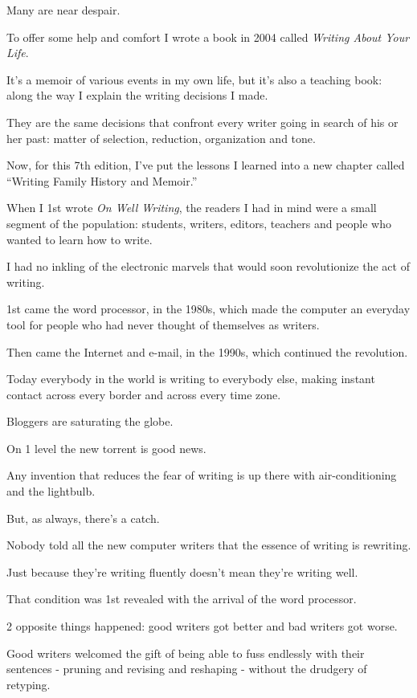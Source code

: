 \documentclass{book}
\numberwithin{equation}{section}
\begin{document}
Many are near despair.

To offer some help and comfort I wrote a book in 2004 called \textit{Writing About Your Life}.

It's a memoir of various events in my own life, but it's also a teaching book: along the way I explain the writing decisions I made.

They are the same decisions that confront every writer going in search of his or her past: matter of selection, reduction, organization and tone.

Now, for this 7th edition, I've put the lessons I learned into a new chapter called ``Writing Family History and Memoir.''

%
When I 1st wrote \textit{On Well Writing}, the readers I had in mind were a small segment of the population: students, writers, editors, teachers and people who wanted to learn how to write.

I had no inkling of the electronic marvels that would soon revolutionize the act of writing.

1st came the word processor, in the 1980s, which made the computer an everyday tool for people who had never thought of themselves as writers.

Then came the Internet and e-mail, in the 1990s, which continued the revolution.

Today everybody in the world is writing to everybody else, making instant contact across every border and across every time zone.

Bloggers are saturating the globe.

%
On 1 level the new torrent is good news.

Any invention that reduces the fear of writing is up there with air-conditioning and the lightbulb.

But, as always, there's a catch.

Nobody told all the new computer writers that the essence of writing is rewriting.

Just because they're writing fluently doesn't mean they're writing well.

%
That condition was 1st revealed with the arrival of the word processor.

2 opposite things happened: good writers got better and bad writers got worse.

Good writers welcomed the gift of being able to fuss endlessly with their sentences - pruning and revising and reshaping - without the drudgery of retyping.
\end{document}
